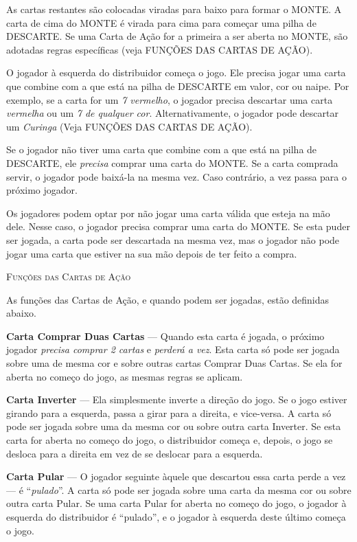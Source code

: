 As cartas restantes são colocadas viradas para baixo para formar o MONTE. A carta de cima do MONTE é virada para cima para começar uma pilha de DESCARTE. Se uma Carta de Ação for a primeira a ser aberta no MONTE, são adotadas regras específicas (veja FUNÇÕES DAS CARTAS DE AÇÃO).

O jogador à esquerda do distribuidor começa o jogo. Ele precisa jogar uma carta que combine com a que está na pilha de DESCARTE em valor, cor ou naipe. Por exemplo, se a carta for um \textit{7 vermelho}, o jogador precisa descartar uma carta \textit{vermelha} ou um \textit{7 de qualquer cor}. Alternativamente, o jogador pode descartar um \textit{Curinga} (Veja FUNÇÕES DAS CARTAS DE AÇÃO).

Se o jogador não tiver uma carta que combine com a que está na pilha de DESCARTE, ele \textit{precisa} comprar uma carta do MONTE. Se a carta comprada servir, o jogador pode baixá-la na mesma vez. Caso contrário, a vez passa para o próximo jogador.

Os jogadores podem optar por não jogar uma carta válida que esteja na mão dele. Nesse caso, o jogador precisa comprar uma carta do MONTE. Se esta puder ser jogada, a carta pode ser descartada na mesma vez, mas o jogador não pode jogar uma carta que estiver na sua mão depois de ter feito a compra.

\textsc{\large{Funções das Cartas de Ação}}

As funções das Cartas de Ação, e quando podem ser jogadas, estão definidas abaixo.

\textbf{Carta Comprar Duas Cartas} --- Quando esta carta é jogada, o próximo jogador \textit{precisa comprar 2 cartas} e \textit{perderá a vez}. Esta carta só pode ser jogada sobre uma de mesma cor e sobre outras cartas Comprar Duas Cartas. Se ela for aberta no começo do jogo, as mesmas regras se aplicam.

\textbf{Carta Inverter} --- Ela simplesmente inverte a direção do jogo. Se o jogo estiver girando para a esquerda, passa a girar para a direita, e vice-versa. A carta só pode ser jogada sobre uma da mesma cor ou sobre outra carta Inverter. Se esta carta for aberta no começo do jogo, o distribuidor começa e, depois, o jogo se desloca para a direita em vez de se deslocar para a esquerda.

\textbf{Carta Pular} --- O jogador seguinte àquele que descartou essa carta perde a vez --- é ``\textit{pulado}''. A carta só pode ser jogada sobre uma carta da mesma cor ou sobre outra carta Pular. Se uma carta Pular for aberta no começo do jogo, o jogador à esquerda do distribuidor é ``pulado'', e o jogador à esquerda deste último começa o jogo.

